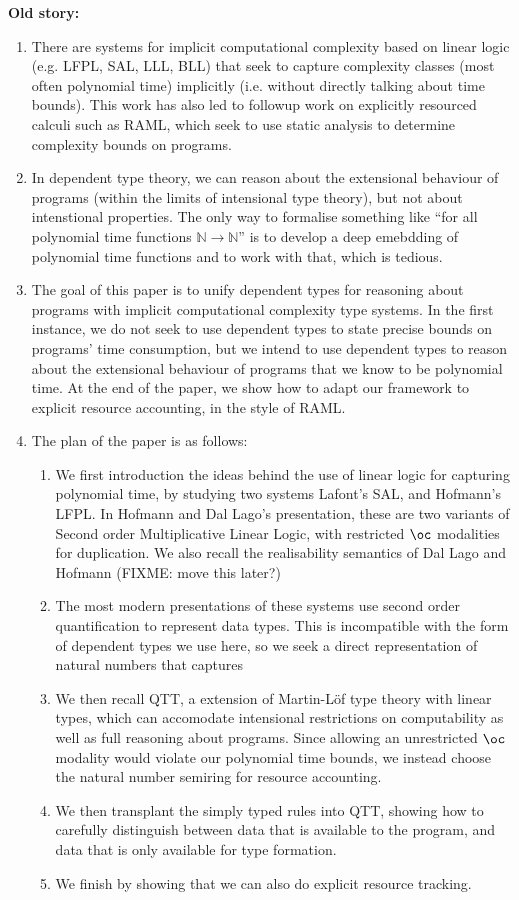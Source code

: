 \documentclass[acmsmall,review]{acmart}
\begin{document}
{\bf Old story:}
\begin{enumerate}
\item There are systems for implicit computational complexity based on
  linear logic (e.g. LFPL, SAL, LLL, BLL) that seek to capture
  complexity classes (most often polynomial time) implicitly
  (i.e. without directly talking about time bounds). This work has
  also led to followup work on explicitly resourced calculi such as
  RAML, which seek to use static analysis to determine complexity
  bounds on programs.
\item In dependent type theory, we can reason about the extensional
  behaviour of programs (within the limits of intensional type
  theory), but not about intenstional properties. The only way to
  formalise something like ``for all polynomial time functions
  $\mathbb{N} \to \mathbb{N}$'' is to develop a deep emebdding of
  polynomial time functions and to work with that, which is tedious.
\item The goal of this paper is to unify dependent types for reasoning
  about programs with implicit computational complexity type
  systems. In the first instance, we do not seek to use dependent
  types to state precise bounds on programs' time consumption, but we
  intend to use dependent types to reason about the extensional
  behaviour of programs that we know to be polynomial time. At the end
  of the paper, we show how to adapt our framework to explicit
  resource accounting, in the style of RAML.
\item The plan of the paper is as follows:
  \begin{enumerate}
  \item We first introduction the ideas behind the use of linear logic
    for capturing polynomial time, by studying two systems Lafont's
    SAL, and Hofmann's LFPL. In Hofmann and Dal Lago's presentation,
    these are two variants of Second order Multiplicative Linear
    Logic, with restricted $\oc$ modalities for duplication. We also
    recall the realisability semantics of Dal Lago and Hofmann (FIXME:
    move this later?)
  \item The most modern presentations of these systems use second
    order quantification to represent data types. This is incompatible
    with the form of dependent types we use here, so we seek a direct
    representation of natural numbers that captures
  \item We then recall QTT, a extension of Martin-Löf type theory with
    linear types, which can accomodate intensional restrictions on
    computability as well as full reasoning about programs. Since
    allowing an unrestricted $\oc$ modality would violate our
    polynomial time bounds, we instead choose the natural number
    semiring for resource accounting.
  \item We then transplant the simply typed rules into QTT, showing
    how to carefully distinguish between data that is available to the
    program, and data that is only available for type formation.
  \item We finish by showing that we can also do explicit resource
    tracking.
  \end{enumerate}
\end{enumerate}
\end{document}
